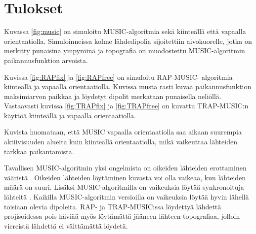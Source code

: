 \section{Tulokset}

Kuvassa \ref{fig:music} on simuloitu MUSIC-algoritmia sekä kiinteällä että vapaalla orientaatiolla. Simuloinneissa kolme lähdedipolia sijoitettiin aivokuorelle, jotka on merkitty punaisina ympyröinä ja topografia on muodostettu MUSIC-algoritmin paikannusfunktion arvoista.

Kuvissa \ref{fig:RAPfix} ja \ref{fig:RAPfree} on simuloitu RAP-MUSIC- algoritmia kiinteällä ja vapaalla orientaatiolla. Kuvissa musta rasti kuvaa paikannusfunktion maksimiarvon paikkaa ja löydetyt dipolit merkataan punaisella neliöllä. Vastaavasti kuvissa \ref{fig:TRAPfix} ja \ref{fig:TRAPfree} on kuvattu TRAP-MUSIC:n käyttöä kiinteällä ja vapaalla orientaatiolla. 

Kuvista huomataan, että MUSIC vapaalla orientaatiolla saa aikaan suurempia aktiivisuuden alueita kuin kiinteällä orientaatiolla, mikä vaikeuttaa lähteiden tarkkaa paikantamista. 

Tavallisen MUSIC-algoritmin yksi ongelmista on oikeiden lähteiden erottaminen vääristä \citep{Mosher1998RecursiveLocalization}. Oikeiden lähteiden löytäminen kuvasta voi olla vaikeaa, kun lähteiden määrä on suuri. Lisäksi MUSIC-algoritmilla on vaikeuksia löytää synkronoituja lähteitä \citep{Mosher1999SourceMUSIC}. Kaikilla MUSIC-algoritmin versioilla on vaikeuksia löytää hyvin lähellä toisiaan olevia dipoleita. RAP- ja TRAP-MUSIC:ssa löydettyä lähdettä projisoidessa pois häviää myös löytämättä jääneen lähteen topografiaa, jolloin viereistä lähdettä ei välttämättä löydetä.

